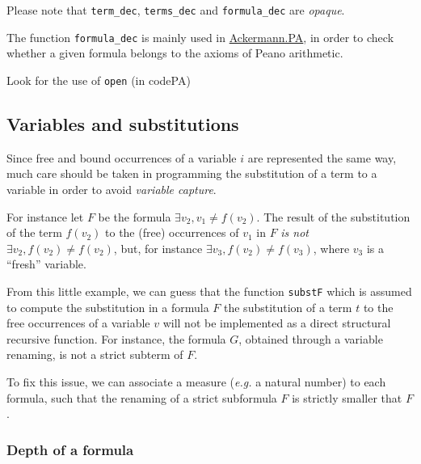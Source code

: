 

\begin{remark}
Please note that \texttt{term\_dec}, \texttt{terms\_dec} and
\texttt{formula\_dec} are \emph{opaque}. 

The function \texttt{formula\_dec} is mainly used in
\href{../theories/html/hydras.Ackermann.PA.html}{Ackermann.PA}, in order to check whether a given formula belongs to the axioms of Peano arithmetic.
\begin{todo}
  Look for the use of \texttt{open}  (in codePA)
\end{todo}

\end{remark}

\subsection{Variables and substitutions}

Since free and bound occurrences of a variable $i$ are represented the same way, much care should be taken in programming the substitution of a term to a variable in order to avoid \emph{variable capture}.

For instance let $F$ be the formula 
$\exists v_2, v_1 \not= f(v_2)$. The result of the substitution 
of the term $f(v_2)$ to the (free) occurrences of $v_1$ in $F$
 \emph{is not} $\exists v_2, f(v_2) \not= f(v_2)$, but, for instance $\exists v_3, f(v_2) \not= f(v_3)$, where $v_3$ is a ``fresh'' variable.



From this little example, we can guess that the function
\texttt{substF} which is assumed to compute the substitution in a formula $F$ the substitution of a term $t$ to the free occurrences of a variable $v$ will not be implemented as a direct structural recursive function. For instance, the formula $G$, obtained through a variable renaming, is not a strict subterm of $F$.

To fix this issue, we can associate  a measure (\emph{e.g.} a natural number) to each formula, such that the renaming of a strict subformula $F$ is strictly smaller that $F$. 



\subsubsection{Depth of a formula}

